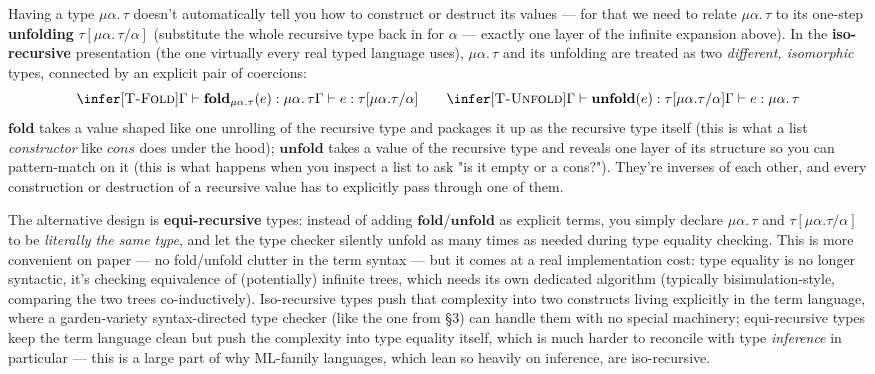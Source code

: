 Having a type $\mu\alpha.\,\tau$ doesn't automatically tell you how to construct or destruct its values — for that we need to relate $\mu\alpha.\,\tau$ to its one-step \textbf{unfolding} $\tau[\mu\alpha.\,\tau / \alpha]$ (substitute the whole recursive type back in for $\alpha$ — exactly one layer of the infinite expansion above). In the \textbf{iso-recursive} presentation (the one virtually every real typed language uses), $\mu\alpha.\,\tau$ and its unfolding are treated as two \emph{different, isomorphic} types, connected by an explicit pair of coercions:
\[
\infer[\textsc{T-Fold}]
  {\Gamma \vdash \mathbf{fold}_{\mu\alpha.\tau}(e) : \mu\alpha.\,\tau}
  {\Gamma \vdash e : \tau[\mu\alpha.\tau / \alpha]}
\qquad
\infer[\textsc{T-Unfold}]
  {\Gamma \vdash \mathbf{unfold}(e) : \tau[\mu\alpha.\tau / \alpha]}
  {\Gamma \vdash e : \mu\alpha.\,\tau}
\]
$\mathbf{fold}$ takes a value shaped like one unrolling of the recursive type and packages it up as the recursive type itself (this is what a list \emph{constructor} like $\mathit{cons}$ does under the hood); $\mathbf{unfold}$ takes a value of the recursive type and reveals one layer of its structure so you can pattern-match on it (this is what happens when you inspect a list to ask "is it empty or a cons?"). They're inverses of each other, and every construction or destruction of a recursive value has to explicitly pass through one of them.

The alternative design is \textbf{equi-recursive} types: instead of adding $\mathbf{fold}$/$\mathbf{unfold}$ as explicit terms, you simply declare $\mu\alpha.\,\tau$ and $\tau[\mu\alpha.\tau/\alpha]$ to be \emph{literally the same type}, and let the type checker silently unfold as many times as needed during type equality checking. This is more convenient on paper — no fold/unfold clutter in the term syntax — but it comes at a real implementation cost: type equality is no longer syntactic, it's checking equivalence of (potentially) infinite trees, which needs its own dedicated algorithm (typically bisimulation-style, comparing the two trees co-inductively). Iso-recursive types push that complexity into two constructs living explicitly in the term language, where a garden-variety syntax-directed type checker (like the one from \S3) can handle them with no special machinery; equi-recursive types keep the term language clean but push the complexity into type equality itself, which is much harder to reconcile with type \emph{inference} in particular — this is a large part of why ML-family languages, which lean so heavily on inference, are iso-recursive.

